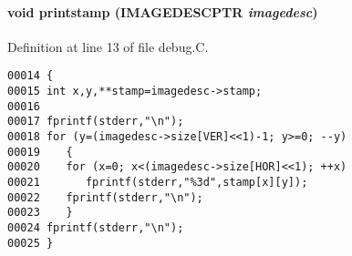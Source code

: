 \paragraph{\setlength{\rightskip}{0pt plus 5cm}void printstamp ({\bf IMAGEDESCPTR} {\em imagedesc})}\hfill



Definition at line 13 of file debug.C.\small\begin{verbatim}00014 {
00015 int x,y,**stamp=imagedesc->stamp;
00016 
00017 fprintf(stderr,"\n");
00018 for (y=(imagedesc->size[VER]<<1)-1; y>=0; --y)
00019    {
00020    for (x=0; x<(imagedesc->size[HOR]<<1); ++x)
00021       fprintf(stderr,"%3d",stamp[x][y]);
00022    fprintf(stderr,"\n");
00023    }
00024 fprintf(stderr,"\n");
00025 }
\end{verbatim}\normalsize 
